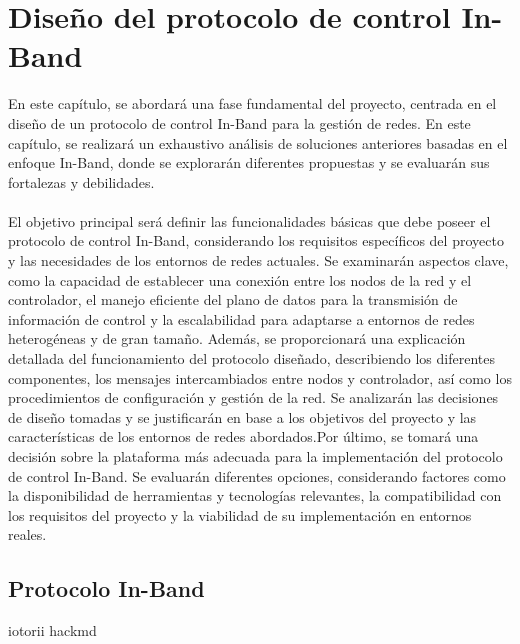 \chapter{Diseño del protocolo de control In-Band}
\label{ch:analisis}

En este capítulo, se abordará una fase fundamental del proyecto, centrada en el diseño de un protocolo de control In-Band para la gestión de redes. En este capítulo, se realizará un exhaustivo análisis de soluciones anteriores basadas en el enfoque In-Band, donde se explorarán diferentes propuestas y se evaluarán sus fortalezas y debilidades.\\
\\
El objetivo principal será definir las funcionalidades básicas que debe poseer el protocolo de control In-Band, considerando los requisitos específicos del proyecto y las necesidades de los entornos de redes actuales. Se examinarán aspectos clave, como la capacidad de establecer una conexión entre los nodos de la red y el controlador, el manejo eficiente del plano de datos para la transmisión de información de control y la escalabilidad para adaptarse a entornos de redes heterogéneas y de gran tamaño. Además, se proporcionará una explicación detallada del funcionamiento del protocolo diseñado, describiendo los diferentes componentes, los mensajes intercambiados entre nodos y controlador, así como los procedimientos de configuración y gestión de la red. Se analizarán las decisiones de diseño tomadas y se justificarán en base a los objetivos del proyecto y las características de los entornos de redes abordados.Por último, se tomará una decisión sobre la plataforma más adecuada para la implementación del protocolo de control In-Band. Se evaluarán diferentes opciones, considerando factores como la disponibilidad de herramientas y tecnologías relevantes, la compatibilidad con los requisitos del proyecto y la viabilidad de su implementación en entornos reales.

\section{Protocolo In-Band}
\label{sec:ana_inband}

iotorii hackmd



